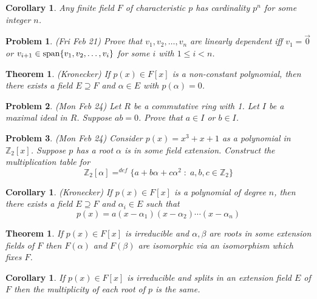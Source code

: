 \documentclass[12pt]{article}
\def\span{{\rm span}}
\def\al{\alpha}
\def\be{\beta}
\def\zz{{\mathbb Z}}
\def\al{\alpha}
\def\be{\beta}
\def\span{{ \rm span }}
\def\st{\;:\;}
\newtheorem{thm}[theorem]{Theorem}
\newtheorem{cor}[theorem]{Corollary}
\newtheorem{prob}{Problem}
\begin{document}
\begin{cor}
Any finite field $F$ of characteristic $p$ has cardinality
$p^n$ for some integer $n$.
\end{cor}

\begin{prob}
(Fri Feb 21) Prove that $v_1,v_2,\ldots,v_n$ are linearly dependent
iff $v_1=\vec{0}$ or $v_{i+1}\in\span\{v_1,v_2,\ldots,v_i\}$
for some $i$ with $1\leq i<n$.
\end{prob}


\begin{thm}
(Kronecker) If $p(x)\in F[x]$ is a non-constant polynomial, then
there exists a field $E\supseteq F$ and $\al\in E$ with
$p(\al)=0$.
\end{thm}

\begin{prob}
(Mon Feb 24) Let $R$ be a commutative ring with 1.  Let $I$ be
a maximal ideal in $R$.  Suppose $ab=0$. Prove that $a\in I$ or 
$b\in I$.
\end{prob}

\begin{prob}
(Mon Feb 24) Consider $p(x)=x^3+x+1$ as a polynomial in $\zz_2[x]$.
Suppose $p$ has a root $\al$ is in some field extension.  Construct
the multiplication table for 
$$\zz_2[\al]=^{def}\{a+b\al+c\al^2 \st a,b,c\in \zz_2\}$$
\end{prob}


\begin{cor}(Kronecker)
If $p(x)\in F[x]$ is a polynomial of degree $n$, then
there exists a field $E\supseteq F$ and $\al_i\in E$ such that
$$p(x)=a(x-\al_1)(x-\al_2)\cdots (x-\al_n)$$
\end{cor}

\begin{thm}
If $p(x)\in F[x]$ is irreducible and $\al,\be$ are roots in
some extension fields of $F$ then $F(\al)$ and $F(\be)$ are
isomorphic via an isomorphism which fixes $F$.
\end{thm}

\begin{cor}
If  $p(x)\in F[x]$ is irreducible and splits in an extension field $E$
of $F$ then the multiplicity of each root of $p$ is the same. 
\end{cor}
\end{document}
